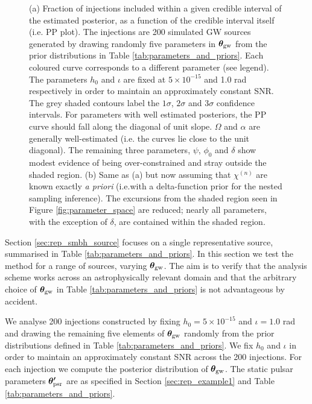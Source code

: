 \documentclass[fleqn,usenatbib,useAMS]{mnras}
\begin{document}
\begin{figure}
	\caption{(a) Fraction of injections included within a given credible interval of the estimated posterior, as a function of the credible interval itself (i.e. PP plot). The injections are 200 simulated GW sources generated by drawing randomly five parameters in $\boldsymbol{\theta}_{\rm gw}$ from the prior distributions in Table \ref{tab:parameters_and_priors}. Each coloured curve corresponds to a different parameter (see legend). The parameters $h_0$ and $\iota$ are fixed at $5 \times 10^{-15}$ and 1.0 rad respectively in order to maintain an approximately constant SNR. The grey shaded contours label the $1\sigma$, $2\sigma$ and 3$\sigma$ confidence intervals. For parameters with well estimated posteriors, the PP curve should fall along the diagonal of unit slope. $\Omega$ and $\alpha$ are generally well-estimated (i.e. the curves lie close to the unit diagonal). The remaining three parameters, $\psi$, $\phi_0$ and $\delta$ show modest evidence of being over-constrained and stray outside the shaded region. (b) Same as (a) but now assuming that $\chi^{(n)}$ are known exactly \textit{a priori} (i.e.with a delta-function prior for the nested sampling inference). The excursions from the shaded region seen in Figure  \ref{fig:parameter_space} are reduced; nearly all parameters, with the exception of $\delta$, are contained within the shaded region. } \label{fig:AB}
\end{figure}






Section \ref{sec:rep_smbh_source} focuses on a single representative source, summarised in Table \ref{tab:parameters_and_priors}. In this section we test the method for a range of sources, varying $\boldsymbol{\theta}_{\rm gw}$. The aim is to verify that the analysis scheme works across an astrophysically relevant domain and that the arbitrary choice of $\boldsymbol{\theta}_{\rm gw}$ in Table \ref{tab:parameters_and_priors} is not advantageous by accident. \newline 

We analyse 200 injections constructed by fixing $h_0 = 5 \times 10^{-15}$ and $\iota =1.0$ rad and drawing the remaining five elements of $\boldsymbol{\theta}_{\rm gw}$ randomly from the prior distributions defined in Table \ref{tab:parameters_and_priors}. We fix $h_0$ and $\iota$ in order to maintain an approximately constant SNR across the 200 injections. For each injection we compute the posterior distribution of ${\boldsymbol{\theta}}_{\rm gw}$. The static pulsar parameters $\boldsymbol{\theta'}_{\rm psr}$ are as specified in Section \ref{sec:rep_example1} and Table  \ref{tab:parameters_and_priors}. \newline 
\end{document}

